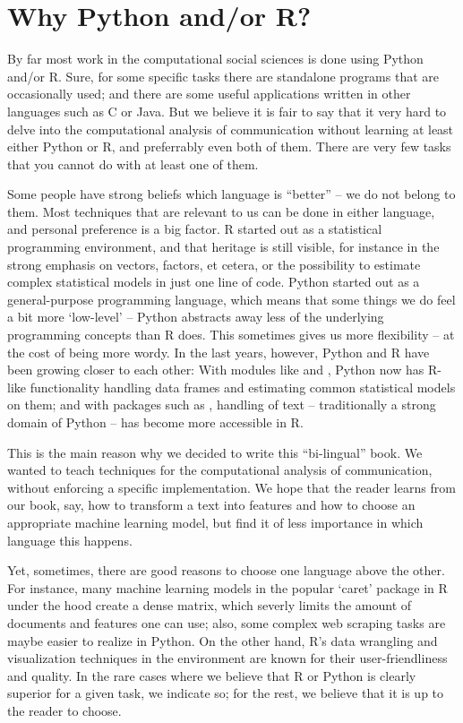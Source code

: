 

\section{Why Python and/or R?}
By far most work in the computational social sciences is done using
Python and/or R. Sure, for some specific tasks there are standalone
programs that are occasionally used; and there are some useful applications
written in other languages such as C or Java. But we believe it is
fair to say that it very hard to delve into the computational analysis
of communication without learning at least either Python or R, and
preferrably even both of them.
There are very few tasks that you cannot do with at least one of them.

Some people have strong beliefs which language is ``better'' -- we do
not belong to them. Most techniques that are relevant to us can be
done in either language, and personal preference is a big factor. R
started out as a statistical programming environment, and that
heritage is still visible, for instance in the strong emphasis on
vectors, factors, et cetera, or the possibility to estimate complex
statistical models in just one line of code. Python started out as a
general-purpose programming language, which means that some things we
do feel a bit more `low-level' -- Python abstracts away less of the
underlying programming concepts than R does. This sometimes gives us
more flexibility -- at the cost of being more wordy.
In the last years, however, Python and R have been
growing closer to each other: With modules like  and
, Python now has R-like functionality handling data
frames and estimating common statistical models on them; and with
packages such as , handling of text -- traditionally a
strong domain of Python -- has become more accessible in R.

This is the main reason why we decided to write this ``bi-lingual''
book. We wanted to teach techniques for the computational analysis of
communication, without enforcing a specific implementation. We hope
that the reader learns from our book, say, how to transform a text
into features and how to choose an appropriate machine learning model,
but find it of less importance in which language this happens.

Yet, sometimes, there are good reasons to choose one language above
the other. For instance, many machine learning models in the popular `caret' package in R under the
hood create a dense matrix, which severly limits the amount of
documents and features one can use; also, some complex web scraping
tasks are maybe easier to realize in Python. On the other hand, R's
data wrangling and visualization techniques in the 
environment are known for their user-friendliness and quality.  In the
rare cases where we believe that R or Python is clearly superior for a
given task, we indicate so; for the rest, we believe that it is up to
the reader to choose.

